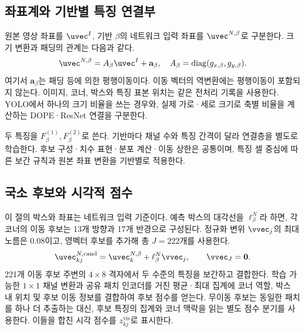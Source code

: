 \subsection{좌표계와 기반별 특징 연결부}
원본 영상 좌표를 $\uvec^I$, 기반 $\beta$의 네트워크 입력 좌표를 $\uvec^{N,\beta}$로 구분한다. 크기 변환과 패딩의 관계는 다음과 같다.
\begin{equation}
 \uvec^{N,\beta}=A_\beta\uvec^I+\mathbf a_\beta,
 \quad A_\beta=\operatorname{diag}(g_{x,\beta},g_{y,\beta}).
 \label{eq:affine}
\end{equation}
여기서 $\mathbf a_\beta$는 패딩 등에 의한 평행이동이다. 이동 벡터의 역변환에는 평행이동이 포함되지 않는다. 이미지, 코너, 박스와 특징 표본 위치는 같은 전처리 기록을 사용한다. YOLO에서 하나의 크기 비율을 쓰는 경우와, 실제 가로·세로 크기로 축별 비율을 계산하는 DOPE·ResNet 연결을 구분한다.

두 특징을 $F^{(1)}_\beta,F^{(2)}_\beta$로 쓴다. 기반마다 채널 수와 특징 간격이 달라 연결층을 별도로 학습한다. 후보 구성·치수 표현·분포 계산·이동 상한은 공통이며, 특징 셀 중심에 따른 보간 규칙과 원본 좌표 변환을 기반별로 적용한다.

\subsection{국소 후보와 시각적 점수}
이 절의 박스와 좌표는 네트워크 입력 기준이다. 예측 박스의 대각선을 $\ell_\beta^N$라 하면, 각 코너의 이동 후보는 13개 방향과 17개 반경으로 구성된다. 정규화 변위 $\vvec_j$의 최대 노름은 0.08이고, 영벡터 후보를 추가해 총 $J=222$개를 사용한다.
\begin{equation}
 \uvec_{kj}^{N,\mathrm{cand}}=\uvec_k^{N,\beta}+\ell_\beta^N\vvec_j,
 \qquad \vvec_J=\mathbf0.
 \label{eq:candidate}
\end{equation}
221개 이동 후보 주변의 $4\times8$ 격자에서 두 수준의 특징을 보간하고 결합한다. 학습 가능한 $1\times1$ 채널 변환과 공유 패치 인코더를 거친 평균·최대 집계에 코너 역할, 박스 내 위치 및 후보 이동 정보를 결합하여 후보 점수를 얻는다. 무이동 후보는 동일한 패치를 하나 더 추출하는 대신, 후보 특징의 집계와 코너 맥락을 읽는 별도 점수 분기를 사용한다. 이들을 합친 시각 점수를 $z^{\mathrm{vis}}_{kj}$로 표시한다.

